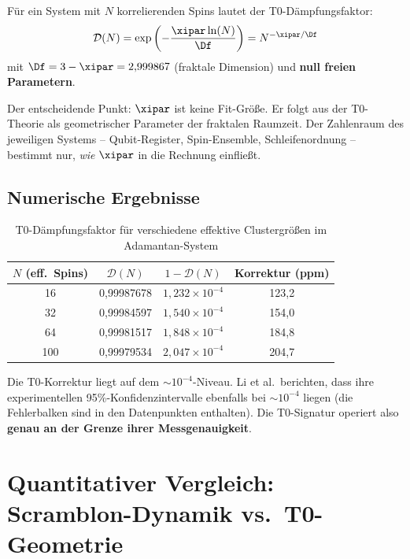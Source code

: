 \begin{definition}
	Für ein System mit $N$ korrelierenden Spins lautet der T0-Dämpfungsfaktor:
	\begin{equation}
		\mathcal{D}(N) = \exp\left(-\frac{\xipar \ln(N)}{\Df}\right) = N^{-\xipar/\Df}
		\label{eq:t0_damping}
	\end{equation}
	mit $\Df = 3 - \xipar = 2{,}999867$ (fraktale Dimension) und \textbf{null freien Parametern}.
\end{definition}

\begin{remark}
	Der entscheidende Punkt: $\xipar$ ist keine Fit-Größe. Er folgt aus der T0-Theorie als geometrischer Parameter der fraktalen Raumzeit. Der Zahlenraum des jeweiligen Systems -- Qubit-Register, Spin-Ensemble, Schleifenordnung -- bestimmt nur, \emph{wie} $\xipar$ in die Rechnung einfließt.
\end{remark}

\subsection{Numerische Ergebnisse}

\begin{table}[h]
	\centering
	\caption{T0-Dämpfungsfaktor für verschiedene effektive Clustergrößen im Adamantan-System}
	\label{tab:t0_damping}
	\begin{tabular}{@{}cccc@{}}
		\toprule
		$N$ (eff.\ Spins) & $\mathcal{D}(N)$ & $1 - \mathcal{D}(N)$ & Korrektur (ppm) \\
		\midrule
		16 & 0,99987678 & $1{,}232 \times 10^{-4}$ & 123,2 \\
		32 & 0,99984597 & $1{,}540 \times 10^{-4}$ & 154,0 \\
		64 & 0,99981517 & $1{,}848 \times 10^{-4}$ & 184,8 \\
		100 & 0,99979534 & $2{,}047 \times 10^{-4}$ & 204,7 \\
		\bottomrule
	\end{tabular}
\end{table}

Die T0-Korrektur liegt auf dem $\sim 10^{-4}$-Niveau. Li et al.\ berichten, dass ihre experimentellen 95\%-Konfidenzintervalle ebenfalls bei $\sim 10^{-4}$ liegen (die Fehlerbalken sind in den Datenpunkten enthalten). Die T0-Signatur operiert also \textbf{genau an der Grenze ihrer Messgenauigkeit}.


\section{Quantitativer Vergleich: Scramblon-Dynamik vs.\ T0-Geometrie}
\label{sec:comparison}


